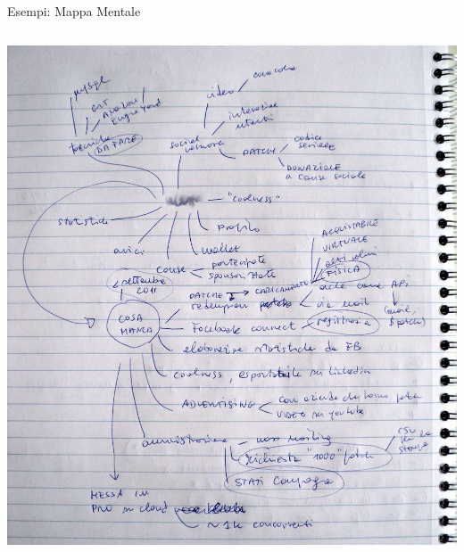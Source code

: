 \begin{frame}{Esempi: Mappa Mentale}
\begin{columns}[T]
\begin{column}{.5\textwidth}
				\hspace*{-0.4cm} \includegraphics[scale=0.17]{images/mindmap-2}
		    \end{column}
		 \end{columns}
	\end{frame}

